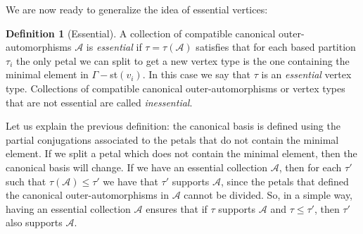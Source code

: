 \documentclass[a4paper]{amsart}
\newcommand{\G}{\Gamma}
\newcommand{\au}{\mathcal{A}}
\theoremstyle{definition}
\newtheorem{defi}[teo]{Definition}
\theoremstyle{remark}
\begin{document}
We are now ready to generalize the idea of essential vertices:

\begin{defi}[Essential]
    A collection of compatible canonical outer-automorphisms $\au$ is {\sl essential} if $\tau=\tau(\au)$ satisfies that for each based partition $\tau_i$ the only petal we can split to get a new vertex type is the one containing the minimal element in $\G-$st$(v_i)$. In this case we say that $\tau$ is an {\sl essential} vertex type. 
    Collections of compatible canonical outer-automorphisms or vertex types that are not essential are called {\sl inessential}.
\end{defi}

Let us explain the previous definition: the canonical basis is defined using the partial conjugations associated to the petals that do not contain the minimal element. If we split a petal which does not contain the minimal element, then the canonical basis will change. If we have an essential collection $\au$, then for each $\tau'$ such that $\tau(\au)\leq\tau'$ we have that $\tau'$ supports $\au$, since the petals that defined the canonical outer-automorphisms in $\au$ cannot be divided. So, in a simple way, having an essential collection $\mathcal{A}$ ensures that if $\tau$ supports $\mathcal{A}$ and $\tau\leq \tau'$, then $\tau'$ also supports $\mathcal{A}$.
\end{document}
